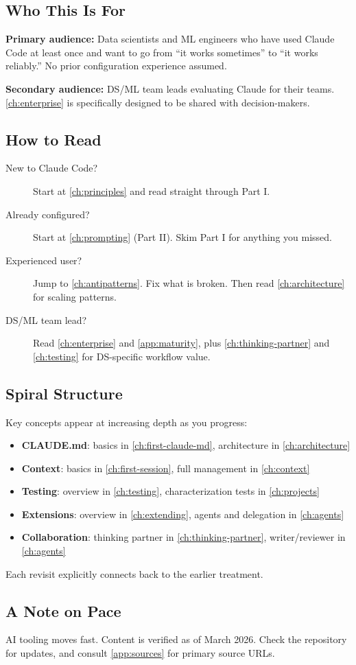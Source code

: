 \subsection*{Who This Is For}

\textbf{Primary audience:} Data scientists and ML engineers who have used Claude Code
at least once and want to go from ``it works sometimes'' to ``it works reliably.''
No prior configuration experience assumed.

\textbf{Secondary audience:} DS/ML team leads evaluating Claude for their teams.
\cref{ch:enterprise} is specifically designed to be shared with decision-makers.

\subsection*{How to Read}

\begin{description}
  \item[New to Claude Code?] Start at \cref{ch:principles} and read straight through Part I.
  \item[Already configured?] Start at \cref{ch:prompting} (Part II).
    Skim Part I for anything you missed.
  \item[Experienced user?] Jump to \cref{ch:antipatterns}. Fix what is broken.
    Then read \cref{ch:architecture} for scaling patterns.
  \item[DS/ML team lead?] Read \cref{ch:enterprise} and \cref{app:maturity},
    plus \cref{ch:thinking-partner} and \cref{ch:testing} for DS-specific workflow value.
\end{description}

\subsection*{Spiral Structure}

Key concepts appear at increasing depth as you progress:

\begin{itemize}
  \item \textbf{CLAUDE.md}: basics in \cref{ch:first-claude-md},
    architecture in \cref{ch:architecture}
  \item \textbf{Context}: basics in \cref{ch:first-session},
    full management in \cref{ch:context}
  \item \textbf{Testing}: overview in \cref{ch:testing},
    characterization tests in \cref{ch:projects}
  \item \textbf{Extensions}: overview in \cref{ch:extending},
    agents and delegation in \cref{ch:agents}
  \item \textbf{Collaboration}: thinking partner in \cref{ch:thinking-partner},
    writer/reviewer in \cref{ch:agents}
\end{itemize}

Each revisit explicitly connects back to the earlier treatment.

\subsection*{A Note on Pace}

AI tooling moves fast. Content is verified as of March 2026.
Check the repository for updates, and consult
\cref{app:sources} for primary source URLs.
